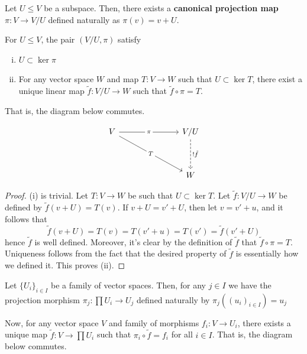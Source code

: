 \begin{defn}
    Let $U \leq V$ be a subspace. Then, there exists a \textbf{canonical projection map} $\pi:V \to V/U$ defined naturally as $\pi(v) =v+U$.
\end{defn}

\begin{thm}
    For $U \leq V$, the pair $(V/U,\pi)$ satisfy
    \begin{enumerate}[(i)]
        \item $U \subset \ker \pi$
        \item For any vector space $W$ and map $T:V \to W$ such that $U \subset \ker T$, there exist a unique linear map $\tilde f:V/U \to W$ such that $\tilde f \circ \pi = T$.
    \end{enumerate}
    That is, the diagram below commutes.
\end{thm}
\[\begin{tikzcd}
	V &&& {V/U} \\
	\\
	&&& W
	\arrow["\pi"{description}, from=1-1, to=1-4]
	\arrow["T"{description}, from=1-1, to=3-4]
	\arrow["{! \tilde f}", dashed, from=1-4, to=3-4]
\end{tikzcd}\]

\begin{proof}
    (i) is trivial. Let $T:V\to W$ be such that $U \subset \ker T$. Let $\tilde f:V/U \to W$ be defined by $\tilde f(v+U)=T(v)$. If $v+U = v'+U$, then let $v= v'+u$, and it follows that
    $$\tilde f(v+U)=T(v)=T(v'+u)=T(v')=\tilde f(v' +U)$$
    hence $\tilde f$ is well defined. Moreover, it's clear by the definition of $\tilde f$ that $\tilde f \circ \pi = T$. Uniqueness follows from the fact that the desired property of $\tilde f$ is essentially how we defined it. This proves (ii).
\end{proof}

\begin{thm}
    Let $\{U_i\}_{i \in I}$ be a family of vector spaces. Then, for any $j \in I$ we have the projection morphism $\pi_j:\prod U_i \to U_j$ defined naturally by $\pi_j((u_i)_{i \in I})=u_j$

    Now, for any vector space $V$ and family of morphisms $f_i:V \to U_i$, there exists a unique map $\tilde f:V \to \prod U_i$ such that $\pi _i \circ \tilde f =f_i$ for all $i \in I$. That is, the diagram below commutes.
\end{thm}

